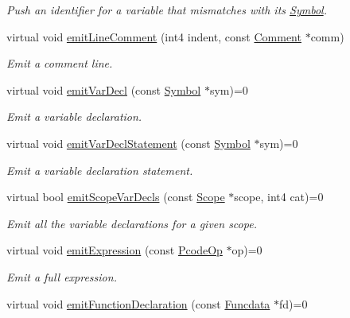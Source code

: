 \begin{DoxyCompactItemize}
\begin{DoxyCompactList}\small\item\em Push an identifier for a variable that mismatches with its \mbox{\hyperlink{class_symbol}{Symbol}}. \end{DoxyCompactList}\item 
virtual void \mbox{\hyperlink{class_print_language_ae98ff6bbfded046b5177d9c6e728b99b}{emit\+Line\+Comment}} (int4 indent, const \mbox{\hyperlink{class_comment}{Comment}} $\ast$comm)
\begin{DoxyCompactList}\small\item\em Emit a comment line. \end{DoxyCompactList}\item 
virtual void \mbox{\hyperlink{class_print_language_a2007b92c662e0261310d2bbac3bfe4f1}{emit\+Var\+Decl}} (const \mbox{\hyperlink{class_symbol}{Symbol}} $\ast$sym)=0
\begin{DoxyCompactList}\small\item\em Emit a variable declaration. \end{DoxyCompactList}\item 
virtual void \mbox{\hyperlink{class_print_language_ab8d65e75ede43bc2f14b926bba89d7ae}{emit\+Var\+Decl\+Statement}} (const \mbox{\hyperlink{class_symbol}{Symbol}} $\ast$sym)=0
\begin{DoxyCompactList}\small\item\em Emit a variable declaration statement. \end{DoxyCompactList}\item 
virtual bool \mbox{\hyperlink{class_print_language_a84affe778545c950190a9d7d3edbf6e5}{emit\+Scope\+Var\+Decls}} (const \mbox{\hyperlink{class_scope}{Scope}} $\ast$scope, int4 cat)=0
\begin{DoxyCompactList}\small\item\em Emit all the variable declarations for a given scope. \end{DoxyCompactList}\item 
virtual void \mbox{\hyperlink{class_print_language_aeb6f62b1d73a32173240647b6953f80e}{emit\+Expression}} (const \mbox{\hyperlink{class_pcode_op}{Pcode\+Op}} $\ast$op)=0
\begin{DoxyCompactList}\small\item\em Emit a full expression. \end{DoxyCompactList}\item 
virtual void \mbox{\hyperlink{class_print_language_a591f782041b30d6d0caf65dcbdd88c78}{emit\+Function\+Declaration}} (const \mbox{\hyperlink{class_funcdata}{Funcdata}} $\ast$fd)=0

\end{DoxyCompactItemize}
